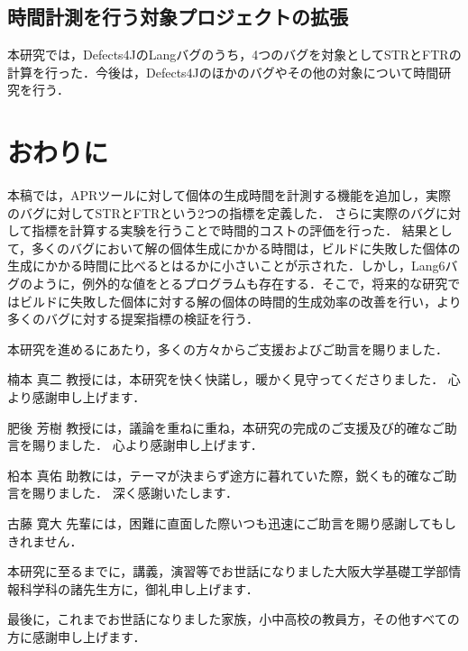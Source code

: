 \documentclass[uplatex,dvipdfmx,a4paper]{jsarticle}
\begin{document}
\subsection{時間計測を行う対象プロジェクトの拡張}
本研究では，Defects4JのLangバグのうち，4つのバグを対象としてSTRとFTRの計算を行った．今後は，Defects4Jのほかのバグやその他の対象について時間研究を行う．
\clearpage
\section{おわりに}\label{sec:concl}
本稿では，APRツールに対して個体の生成時間を計測する機能を追加し，実際のバグに対してSTRとFTRという2つの指標を定義した．
さらに実際のバグに対して指標を計算する実験を行うことで時間的コストの評価を行った．
結果として，多くのバグにおいて解の個体生成にかかる時間は，ビルドに失敗した個体の生成にかかる時間に比べるとはるかに小さいことが示された．しかし，Lang6バグのように，例外的な値をとるプログラムも存在する．そこで，将来的な研究ではビルドに失敗した個体に対する解の個体の時間的生成効率の改善を行い，より多くのバグに対する提案指標の検証を行う．
\clearpage
\acknowledgement

本研究を進めるにあたり，多くの方々からご支援およびご助言を賜りました．

楠本 真二 教授には，本研究を快く快諾し，暖かく見守ってくださりました．
心より感謝申し上げます．

肥後 芳樹 教授には，議論を重ねに重ね，本研究の完成のご支援及び的確なご助言を賜りました．
心より感謝申し上げます．

柗本 真佑 助教には，テーマが決まらず途方に暮れていた際，鋭くも的確なご助言を賜りました．
深く感謝いたします．

古藤 寛大 先輩には，困難に直面した際いつも迅速にご助言を賜り感謝してもしきれません．

本研究に至るまでに，講義，演習等でお世話になりました大阪大学基礎工学部情報科学科の諸先生方に，御礼申し上げます．

最後に，これまでお世話になりました家族，小中高校の教員方，その他すべての方に感謝申し上げます．
\clearpage


\end{document}
